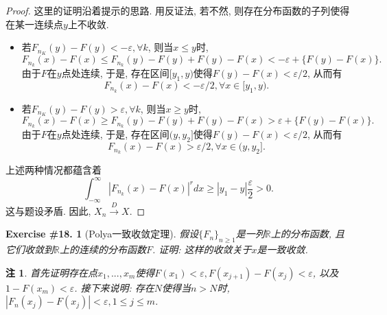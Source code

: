 \documentclass[UTF8, a4paper]{article}
\newtheorem{exercise}{Exercise \#18.}
\newtheorem*{remark}{注}
\begin{document}
\begin{proof}
这里的证明沿着提示的思路. 用反证法, 若不然, 则存在分布函数的子列使得在某一连续点\(y\)上不收敛.

\begin{itemize}
    \item 若\(F_{n_K}(y) - F(y) < -\varepsilon, \forall k\), 则当\(x \leq y\)时, $$
    F_{n_k}(x) - F(x) \leq F_{n_k}(y) - F(y) + F(y) - F(x) < -\varepsilon + \{F(y) - F(x)\}.
    $$
    由于\(F\)在\(y\)点处连续, 于是, 存在区间\([y_1, y)\)使得\(F(y) - F(x) < \varepsilon/2\), 从而有
    $$
    F_{n_k}(x) - F(x) < -\varepsilon/2, \forall x \in [y_1, y).
    $$
    \item 若\(F_{n_K}(y) - F(y) > \varepsilon, \forall k\), 则当\(x \geq y\)时, $$
    F_{n_k}(x) - F(x) \geq F_{n_k}(y) - F(y) + F(y) - F(x) > \varepsilon + \{F(y) - F(x)\}.
    $$
    由于\(F\)在\(y\)点处连续, 于是, 存在区间\((y, y_2]\)使得\(F(y) - F(x) < \varepsilon/2\), 从而有
    $$
    F_{n_k}(x) - F(x) > \varepsilon/2, \forall x \in (y, y_2].
    $$
\end{itemize}
上述两种情况都蕴含着
$$
\int_{-\infty}^{\infty} |F_{n_k}(x) - F(x)|^r dx \geq |y_1-y|\frac{\varepsilon}{2} > 0.
$$
这与题设矛盾. 因此, \(X_n \xrightarrow{D}X\).
\end{proof}






\begin{framed}
\begin{exercise}[Polya一致收敛定理]
假设\(\{F_n\}_{n\geq 1}\)是一列\(\mathbb{R}\)上的分布函数, 且它们收敛到\(\mathbb{R}\)上的连续的分布函数\(F\).
证明: 这样的收敛关于\(x\)是一致收敛.
\end{exercise}
\end{framed}

\begin{remark}
首先证明存在点\(x_1, ..., x_m\)使得\(F(x_1) < \varepsilon, F(x_{j+1}) - F(x_{j}) < \varepsilon\), 以及\(1 - F(x_m) < \varepsilon\).
接下来说明: 存在\(N\)使得当\(n>N\)时, \(|F_n(x_j) - F(x_j)| < \varepsilon, 1 \leq j \leq m\).
\end{remark}
\end{document}
